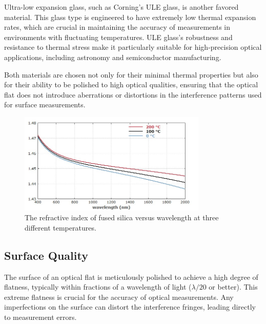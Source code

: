 \documentclass[../main.tex]{subfiles}
\begin{document}

Ultra-low expansion glass, such as Corning's ULE glass, is another favored material. This glass type is engineered to have extremely low thermal expansion rates, which are crucial in maintaining the accuracy of measurements in environments with fluctuating temperatures. ULE glass's robustness and resistance to thermal stress make it particularly suitable for high-precision optical applications, including astronomy and semiconductor manufacturing.\cite{Corning_2022}

Both materials are chosen not only for their minimal thermal properties but also for their ability to be polished to high optical qualities, ensuring that the optical flat does not introduce aberrations or distortions in the interference patterns used for surface measurements.\cite{Corning_2022,Paschottafused_silica,doi:https://doi.org/10.1002/9780470135976.ch1}
\begin{figure}[H]
    \centering
    \includegraphics[width=0.8\textwidth]{Images/Introduction/silica_refractive_index}
    \caption{The refractive index of fused silica versus wavelength at three different temperatures. \cite{Paschottafused_silica}}
    \label{fig:refractive_index_silica}
\end{figure}
\subsection{Surface Quality}
The surface of an optical flat is meticulously polished to achieve a high degree of flatness, typically within fractions of a wavelength of light (\(\lambda/20\) or better). This extreme flatness is crucial for the accuracy of optical measurements. Any imperfections on the surface can distort the interference fringes, leading directly to measurement errors.\cite{enwiki:1212101911}
\end{document}
